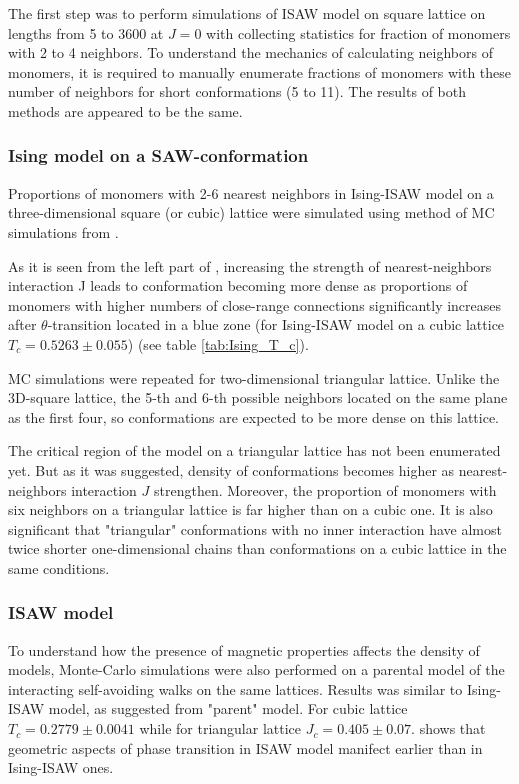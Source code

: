 The first step was to perform simulations of ISAW model on square lattice on lengths from 5 to 3600 at $J=0$ with collecting statistics for fraction of monomers with 2 to 4 neighbors. 
To understand the mechanics of calculating neighbors of monomers, it is required to manually enumerate fractions of monomers with these number of neighbors for short conformations (5 to 11). 
The results of both methods are appeared to be the same.


\subsubsection{Ising model on a SAW-conformation}

Proportions of monomers with 2-6 nearest neighbors in Ising-ISAW model on a three-dimensional square (or cubic) lattice were simulated using method of MC simulations from \cite{faizullina2021critical}.

As it is seen from the left part of , increasing the strength of nearest-neighbors interaction J leads to conformation becoming more dense as proportions of monomers with higher numbers of close-range connections significantly increases after $\theta$-transition located in a blue zone (for Ising-ISAW model on a cubic lattice $T_{c} = 0.5263 \pm 0.055$\cite{Foster2021}) (see table \ref{tab:Ising_T_c}).

MC simulations were repeated for two-dimensional triangular lattice. 
Unlike the 3D-square lattice, the 5-th and 6-th possible neighbors located on the same plane as the first four, so conformations are expected to be more dense on this lattice.

The critical region of the model on a triangular lattice has not been enumerated yet. 
But as it was suggested, density of conformations becomes higher as nearest-neighbors interaction $J$ strengthen. 
Moreover, the proportion of monomers with six neighbors on a triangular lattice is far higher than on a cubic one. 
It is also significant that "triangular" conformations with no inner interaction have almost twice shorter one-dimensional chains than conformations on a cubic lattice in the same conditions.

\subsubsection{ISAW model}

To understand how the presence of magnetic properties affects the density of models, Monte-Carlo simulations were also performed on a parental model of the interacting self-avoiding walks on the same lattices. 
Results was similar to Ising-ISAW model, as suggested from "parent" model. 
For cubic lattice $T_{c} = 0.2779\pm 0.0041 $\cite{Tesi1996} while for triangular lattice $J_{c} = 0.405 \pm 0.07 $\cite{Privman1986}. 
 shows that geometric aspects of phase transition in ISAW model manifect earlier than in Ising-ISAW ones.  



